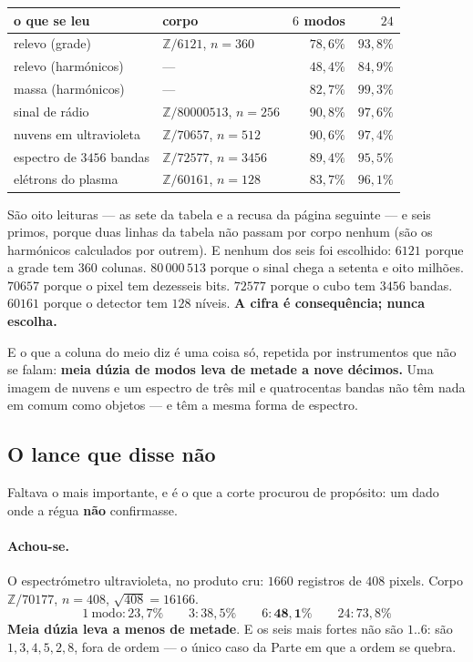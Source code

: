 \documentclass[11pt]{article}
\newcommand{\Z}{\mathbb Z}
\theoremstyle{plain}
\theoremstyle{remark}
\begin{document}
\begin{center}
\begin{tabular}{@{}llrr@{}}
\toprule
o que se leu & corpo & $6$ modos & $24$ \\
\midrule
relevo (grade) & $\Z/6121$, $n=360$ & $78{,}6\%$ & $93{,}8\%$ \\
relevo (harmónicos) & --- & $48{,}4\%$ & $84{,}9\%$ \\
massa (harmónicos) & --- & $82{,}7\%$ & $99{,}3\%$ \\
sinal de rádio & $\Z/80000513$, $n=256$ & $90{,}8\%$ & $97{,}6\%$ \\
nuvens em ultravioleta & $\Z/70657$, $n=512$ & $90{,}6\%$ & $97{,}4\%$ \\
espectro de $3456$ bandas & $\Z/72577$, $n=3456$ & $89{,}4\%$ & $95{,}5\%$ \\
elétrons do plasma & $\Z/60161$, $n=128$ & $83{,}7\%$ & $96{,}1\%$ \\
\bottomrule
\end{tabular}
\end{center}

\noindent São oito leituras --- as sete da tabela e a recusa da página
seguinte --- e seis primos, porque duas linhas da tabela não passam por corpo
nenhum (são os harmónicos calculados por outrem). E nenhum dos seis foi
escolhido: $6121$ porque a grade tem $360$ colunas. $80\,000\,513$ porque o
sinal chega a setenta e oito milhões. $70657$ porque o pixel tem dezesseis
bits. $72577$ porque o cubo tem $3456$ bandas. $60161$ porque o detector tem
$128$ níveis. \textbf{A cifra é consequência; nunca escolha.}

\medskip
\noindent E o que a coluna do meio diz é uma coisa só, repetida por
instrumentos que não se falam: \textbf{meia dúzia de modos leva de metade a
nove décimos.} Uma imagem de nuvens e um espectro de três mil e quatrocentas
bandas não têm nada em comum como objetos --- e têm a mesma forma de espectro.

\subsection{O lance que disse não}

Faltava o mais importante, e é o que a corte procurou de propósito: um dado
onde a régua \textbf{não} confirmasse.

\paragraph{Achou-se.} O espectrómetro ultravioleta, no produto cru: $1660$
registros de $408$ pixels. Corpo $\Z/70177$, $n=408$, $\sqrt{408}=16166$.
\[
1\ \text{modo}: 23{,}7\%\qquad 3: 38{,}5\%\qquad 6: \mathbf{48{,}1\%}
\qquad 24: 73{,}8\%
\]
\textbf{Meia dúzia leva a menos de metade}. E os seis mais fortes não são
$1..6$: são $1,3,4,5,2,8$, fora de ordem --- o único caso da Parte em que a
ordem se quebra.
\end{document}
